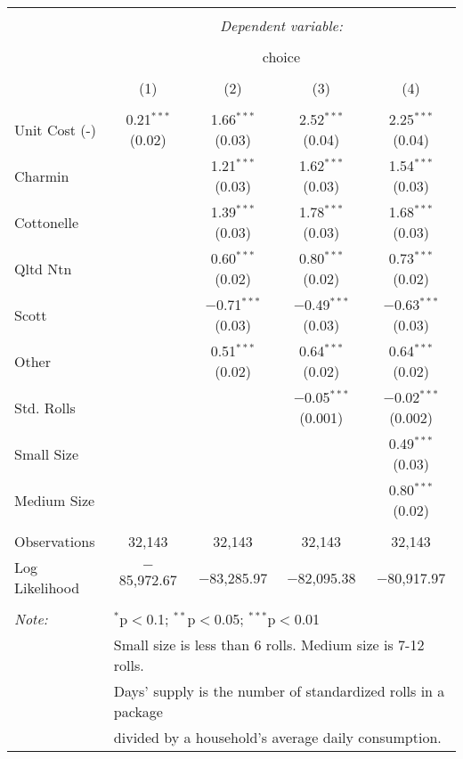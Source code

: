 
\begin{table}[!htbp] \centering 
  \caption{} 
  \label{tab:mnlLos AngelesBaseline} 
\begin{tabular}{@{\extracolsep{5pt}}lcccc} 
\\[-1.8ex]\hline 
\hline \\[-1.8ex] 
 & \multicolumn{4}{c}{\textit{Dependent variable:}} \\ 
\cline{2-5} 
\\[-1.8ex] & \multicolumn{4}{c}{choice} \\ 
\\[-1.8ex] & (1) & (2) & (3) & (4)\\ 
\hline \\[-1.8ex] 
 Unit Cost (-) & 0.21$^{***}$ (0.02) & 1.66$^{***}$ (0.03) & 2.52$^{***}$ (0.04) & 2.25$^{***}$ (0.04) \\ 
  Charmin &  & 1.21$^{***}$ (0.03) & 1.62$^{***}$ (0.03) & 1.54$^{***}$ (0.03) \\ 
  Cottonelle &  & 1.39$^{***}$ (0.03) & 1.78$^{***}$ (0.03) & 1.68$^{***}$ (0.03) \\ 
  Qltd Ntn &  & 0.60$^{***}$ (0.02) & 0.80$^{***}$ (0.02) & 0.73$^{***}$ (0.02) \\ 
  Scott &  & $-$0.71$^{***}$ (0.03) & $-$0.49$^{***}$ (0.03) & $-$0.63$^{***}$ (0.03) \\ 
  Other &  & 0.51$^{***}$ (0.02) & 0.64$^{***}$ (0.02) & 0.64$^{***}$ (0.02) \\ 
  Std. Rolls &  &  & $-$0.05$^{***}$ (0.001) & $-$0.02$^{***}$ (0.002) \\ 
  Small Size &  &  &  & 0.49$^{***}$ (0.03) \\ 
  Medium Size &  &  &  & 0.80$^{***}$ (0.02) \\ 
 \hline \\[-1.8ex] 
Observations & 32,143 & 32,143 & 32,143 & 32,143 \\ 
Log Likelihood & $-$85,972.67 & $-$83,285.97 & $-$82,095.38 & $-$80,917.97 \\ 
\hline 
\hline \\[-1.8ex] 
\textit{Note:}  & \multicolumn{4}{l}{$^{*}$p$<$0.1; $^{**}$p$<$0.05; $^{***}$p$<$0.01} \\ 
 & \multicolumn{4}{l}{Small size is less than 6 rolls. Medium size is 7-12 rolls. } \\ 
 & \multicolumn{4}{l}{Days' supply is the number of standardized rolls in a package} \\ 
 & \multicolumn{4}{l}{divided by a household's average daily consumption.} \\ 
\end{tabular} 
\end{table} 
